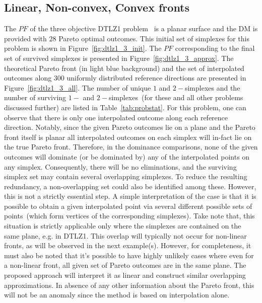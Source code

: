 \subsection{Linear, Non-convex, Convex fronts} 
The $PF$ of the three objective DTLZ1 problem~\cite{deb2002scalable} is a planar surface and the DM is provided with $28$ Pareto optimal outcomes. This initial set of {\color{blue}simplexes} for this problem is shown in Figure~\ref{fig:dtlz1_3_init}. The $PF$ corresponding to the final set of survived {\color{blue}simplexes} is presented in Figure~\ref{fig:dtlz1_3_approx}. The theoretical Pareto front (in light blue background) and the set of interpolated outcomes along $300$ uniformly distributed reference directions are presented in Figure~\ref{fig:dtlz1_3_all}. The number of unique $1$ and $2-${\color{blue}simplexes} and the number of surviving $1-$ and $2-${\color{blue}simplexes}~(for these and all other problems discussed further) are listed in Table~\ref{tab:probstat}. For this problem, one can observe that there is only one interpolated outcome along each reference direction. {\color{blue}Notably, since the given Pareto outcomes lie on a plane and the Pareto front itself is planar all interpolated outcomes on each simplex will in-fact lie on the true Pareto front. Therefore, in the dominance comparisons, none of the given outcomes will dominate (or be dominated by) any of the interpolated points on any simplex. Consequently, there will be no eliminations, and the surviving simplex set may contain several overlapping simplexes}. To reduce the resulting redundancy, a non-overlapping set could also be identified among these. However, this is not a strictly essential step. A simple interpretation of the case is that it is possible to obtain a given interpolated point via several different possible sets of points~(which form vertices of the corresponding {\color{blue}simplexes}). {\color{blue}Take note that, this situation is strictly applicable only where the simplexes are contained on the same plane, e.g. in DTLZ1. This overlap will typically not occur for non-linear fronts, as will be observed in the next example(s). However, for completeness, it must also be noted that it’s possible to have highly unlikely cases where even for a non-linear front, all given set of Pareto outcomes are in the same plane. The proposed approach will interpret it as linear and construct similar overlapping approximations. In absence of any other information about the Pareto front, this will not be an anomaly since the method is based on interpolation alone.} 

